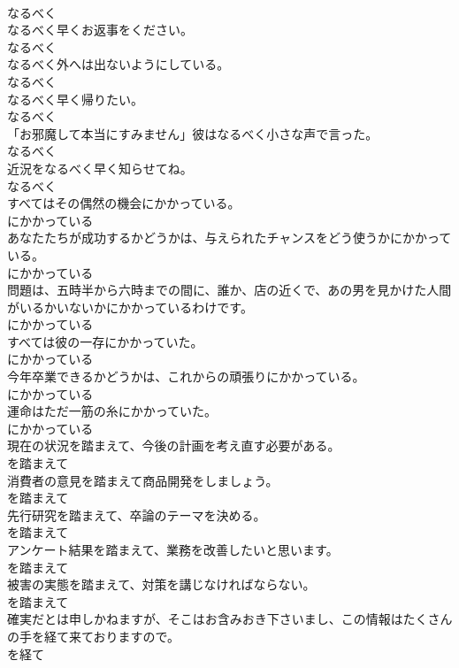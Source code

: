 \documentclass[8pt]{extreport}
\begin{document}
\begin{CJK}{UTF8}{min}
\\	なるべく	
\\	なるべく早くお返事をください。	
\\	なるべく	
\\	なるべく外へは出ないようにしている。	
\\	なるべく	
\\	なるべく早く帰りたい。	
\\	なるべく	
\\	「お邪魔して本当にすみません」彼はなるべく小さな声で言った。	
\\	なるべく	
\\	近況をなるべく早く知らせてね。	
\\	なるべく	
\\	すべてはその偶然の機会にかかっている。	
\\	にかかっている	
\\	あなたたちが成功するかどうかは、与えられたチャンスをどう使うかにかかっている。	
\\	にかかっている	
\\	問題は、五時半から六時までの間に、誰か、店の近くで、あの男を見かけた人間がいるかいないかにかかっているわけです。	
\\	にかかっている	
\\	すべては彼の一存にかかっていた。	
\\	にかかっている	
\\	今年卒業できるかどうかは、これからの頑張りにかかっている。	
\\	にかかっている	
\\	運命はただ一筋の糸にかかっていた。	
\\	にかかっている	
\\	現在の状況を踏まえて、今後の計画を考え直す必要がある。	
\\	を踏まえて	
\\	消費者の意見を踏まえて商品開発をしましょう。	
\\	を踏まえて	
\\	先行研究を踏まえて、卒論のテーマを決める。	
\\	を踏まえて	
\\	アンケート結果を踏まえて、業務を改善したいと思います。	
\\	を踏まえて	
\\	被害の実態を踏まえて、対策を講じなければならない。	
\\	を踏まえて	
\\	確実だとは申しかねますが、そこはお含みおき下さいまし、この情報はたくさんの手を経て来ておりますので。	
\\	を経て	

\end{CJK}
\end{document}
